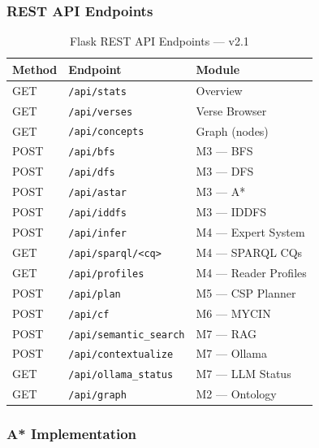 \documentclass[conference]{IEEEtran}
\begin{document}
\subsubsection{REST API Endpoints}

\begin{table}[!t]
\caption{Flask REST API Endpoints — v2.1}
\label{tab:api}
\centering
\small
\begin{tabular}{@{}l l l@{}}
\toprule
\textbf{Method} & \textbf{Endpoint} & \textbf{Module} \\
\midrule
GET  & \texttt{/api/stats}           & Overview \\
GET  & \texttt{/api/verses}          & Verse Browser \\
GET  & \texttt{/api/concepts}        & Graph (nodes) \\
POST & \texttt{/api/bfs}      & M3 — BFS \\
POST & \texttt{/api/dfs}      & M3 — DFS \\
POST & \texttt{/api/astar}    & M3 — A* \\
POST & \texttt{/api/iddfs}    & M3 — IDDFS \\
POST & \texttt{/api/infer}           & M4 — Expert System \\
GET  & \texttt{/api/sparql/<cq>}     & M4 — SPARQL CQs \\
GET  & \texttt{/api/profiles}        & M4 — Reader Profiles \\
POST & \texttt{/api/plan}            & M5 — CSP Planner \\
POST & \texttt{/api/cf}  & M6 — MYCIN \\
POST & \texttt{/api/semantic\_search}& M7 — RAG \\
POST & \texttt{/api/contextualize}   & M7 — Ollama \\
GET  & \texttt{/api/ollama\_status}  & M7 — LLM Status \\
GET  & \texttt{/api/graph}     & M2 — Ontology \\
\bottomrule
\end{tabular}
\end{table}

\subsubsection{A* Implementation}
\end{document}
